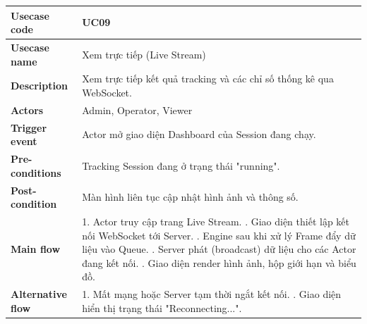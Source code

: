 \documentclass[12pt,a4paper]{article}
\begin{document}
\begin{table}[H]
\centering
\begin{tabular}{|l|p{12cm}|}
\hline
\textbf{Usecase code} & UC09 \\ \hline
\textbf{Usecase name} & Xem trực tiếp (Live Stream) \\ \hline
\textbf{Description} & Xem trực tiếp kết quả tracking và các chỉ số thống kê qua WebSocket. \\ \hline
\textbf{Actors} & Admin, Operator, Viewer \\ \hline
\textbf{Trigger event} & Actor mở giao diện Dashboard của Session đang chạy. \\ \hline
\textbf{Pre-conditions} & Tracking Session đang ở trạng thái "running". \\ \hline
\textbf{Post-condition} & Màn hình liên tục cập nhật hình ảnh và thông số. \\ \hline
\textbf{Main flow} & 
1. Actor truy cập trang Live Stream. \newline
2. Giao diện thiết lập kết nối WebSocket tới Server. \newline
3. Engine sau khi xử lý Frame đẩy dữ liệu vào Queue. \newline
4. Server phát (broadcast) dữ liệu cho các Actor đang kết nối. \newline
5. Giao diện render hình ảnh, hộp giới hạn và biểu đồ. \\ \hline
\textbf{Alternative flow} & 
1. Mất mạng hoặc Server tạm thời ngắt kết nối. \newline
2. Giao diện hiển thị trạng thái "Reconnecting...". \\ \hline
\end{tabular}
\end{table}
\end{document}
